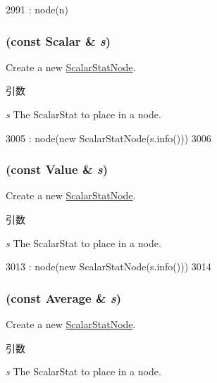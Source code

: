 \begin{DoxyCode}
2991 : node(n) { }
\end{DoxyCode}
\hypertarget{classStats_1_1Temp_aa02dfb018c63e8196ff452cdf370f3ed}{
\subsubsection[{Temp}]{ (const {\bf Scalar} \& {\em s})}}
\label{classStats_1_1Temp_aa02dfb018c63e8196ff452cdf370f3ed}
Create a new \hyperlink{classStats_1_1ScalarStatNode}{ScalarStatNode}. 
\begin{DoxyParams}{引数}
\item[{\em s}]The ScalarStat to place in a node. \end{DoxyParams}



\begin{DoxyCode}
3005         : node(new ScalarStatNode(s.info()))
3006     { }
\end{DoxyCode}
\hypertarget{classStats_1_1Temp_a525d405efbc8ec4d0dbe2fe6f7ec3a27}{
\subsubsection[{Temp}]{ (const {\bf Value} \& {\em s})}}
\label{classStats_1_1Temp_a525d405efbc8ec4d0dbe2fe6f7ec3a27}
Create a new \hyperlink{classStats_1_1ScalarStatNode}{ScalarStatNode}. 
\begin{DoxyParams}{引数}
\item[{\em s}]The ScalarStat to place in a node. \end{DoxyParams}



\begin{DoxyCode}
3013         : node(new ScalarStatNode(s.info()))
3014     { }
\end{DoxyCode}
\hypertarget{classStats_1_1Temp_a327e351577e2e3ba66e0aef0f804bef9}{
\subsubsection[{Temp}]{ (const {\bf Average} \& {\em s})}}
\label{classStats_1_1Temp_a327e351577e2e3ba66e0aef0f804bef9}
Create a new \hyperlink{classStats_1_1ScalarStatNode}{ScalarStatNode}. 
\begin{DoxyParams}{引数}
\item[{\em s}]The ScalarStat to place in a node. \end{DoxyParams}



